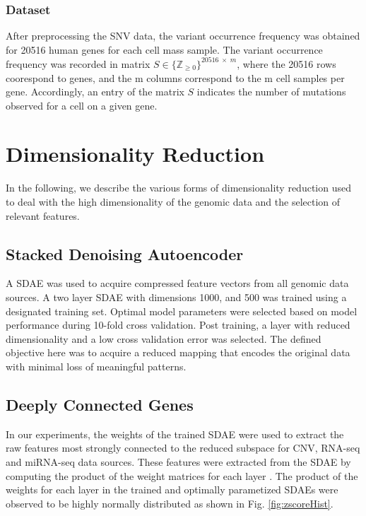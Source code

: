 \subsubsection{Dataset}

After preprocessing the SNV data, the variant occurrence frequency was obtained for 20516 human genes for each cell mass sample. The variant occurrence frequency was recorded in matrix $S \in \{\mathbb{Z}_{\geq 0}\}^{20516 \; \times \; m}$, where the 20516 rows coorespond to genes, and the m columns correspond to the m cell samples per gene. Accordingly, an entry of the matrix $S$ indicates the number of mutations observed for a cell on a given gene. 

\section{Dimensionality Reduction}

In the following, we describe the various forms of dimensionality reduction used to deal with the high dimensionality of the genomic data and the selection of relevant features. 

\subsection{Stacked Denoising Autoencoder}


A SDAE was used to acquire compressed feature vectors from all genomic data sources. A two layer SDAE with dimensions 1000, and 500 was trained using a designated training set. Optimal model parameters were selected based on model performance during 10-fold cross validation. Post training, a layer with reduced dimensionality and a low cross validation error was selected. The defined objective here was to acquire a reduced mapping that encodes the original data with minimal loss of meaningful patterns.


\subsection{Deeply Connected Genes}

In our experiments, the weights of the trained SDAE were used to extract the raw features most strongly connected to the reduced subspace for CNV, RNA-seq and miRNA-seq data sources. These features were extracted from the SDAE by computing the product of the weight matrices for each layer \cite{danaee2017deep}. 
The product of the weights for each layer in the trained and optimally parametized SDAEs were observed to be highly normally distributed as shown in Fig. \ref{fig:zscoreHist}. 

